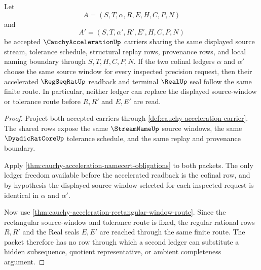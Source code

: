 \begin{theorem}
\label{thm:cauchy-acceleration-cofinal-ledger-determinism}
Let
$$
A=(S,T,\alpha,R,E,H,C,P,N)
$$
and
$$
A'=(S,T,\alpha',R',E',H,C,P,N)
$$
be accepted $\CauchyAccelerationUp$ carriers sharing the same displayed source stream, tolerance schedule, structural replay rows, provenance rows, and local naming boundary through $S,T,H,C,P,N$. If the two cofinal ledgers $\alpha$ and $\alpha'$ choose the same source window for every inspected precision request, then their accelerated $\RegSeqRatUp$ readback and terminal $\RealUp$ seal follow the same finite route. In particular, neither ledger can replace the displayed source-window or tolerance route before $R,R'$ and $E,E'$ are read.
\end{theorem}
\begin{proof}
Project both accepted carriers through \autoref{def:cauchy-acceleration-carrier}. The shared rows expose the same $\StreamNameUp$ source windows, the same $\DyadicRatCoreUp$ tolerance schedule, and the same replay and provenance boundary.

Apply \autoref{thm:cauchy-acceleration-namecert-obligations} to both packets. The only ledger freedom available before the accelerated readback is the cofinal row, and by hypothesis the displayed source window selected for each inspected request is identical in $\alpha$ and $\alpha'$.

Now use \autoref{thm:cauchy-acceleration-rectangular-window-route}. Since the rectangular source-window and tolerance route is fixed, the regular rational rows $R,R'$ and the Real seals $E,E'$ are reached through the same finite route. The packet therefore has no row through which a second ledger can substitute a hidden subsequence, quotient representative, or ambient completeness argument.
\end{proof}


\begin{closurestatus}{\CauchyAccelerationUp}
  \theoryclosure{\seedClosure}
  \formalstatus{\unformalizedV}
\end{closurestatus}
